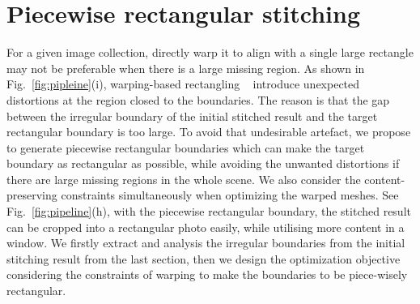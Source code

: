\documentclass[10pt,journal,compsoc]{IEEEtran}
\begin{document}
\section{Piecewise rectangular stitching}
For a given image collection, directly warp it to align with a single large rectangle may not be preferable when there is a large missing region. As shown in Fig.~\ref{fig:pipleine}(i), warping-based rectangling ~\cite{journals/tog/HeC013} introduce unexpected distortions at the region closed to the boundaries. The reason is that the gap between the irregular boundary of the initial stitched result and the target rectangular boundary is too large.
To avoid that undesirable artefact, we propose to generate piecewise rectangular boundaries which can make the target boundary as rectangular as possible, while avoiding the unwanted distortions if there are large missing regions in the whole scene. We also consider the content-preserving constraints simultaneously when optimizing the warped meshes.
See Fig.~\ref{fig:pipeline}(h), with the piecewise rectangular boundary, the stitched result can be cropped into a rectangular photo easily, while utilising more content in a window.
We firstly extract and analysis the irregular boundaries from the initial stitching result from the last section, then we design the optimization objective considering the constraints of warping to make the boundaries to be piece-wisely rectangular. 

\end{document}
